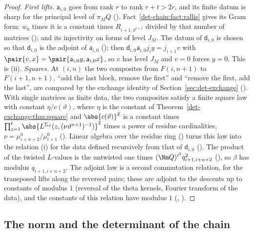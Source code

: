 \begin{proof}
\emph{First lifts.} $\mathsf a_{i,0}$ goes from rank $r$ to rank $r+t>2r$, and its finite datum is sharp
for the principal level of $\pi_MQ$ ().
Fact~\ref{det-chain:fact:rallis} gives its Gram form: $w_0$ times it is a constant times
$R_{i+1,\vartheta^{i+1}}$ divided by that number of matrices
(); and its injectivity on forms of level
$J_M$. The datum of $\mathsf d_{i,0}$ is chosen so that $\mathsf d_{i,0}$ is the adjoint of $\mathsf a_{i,0}$
(); then
$\mathsf d_{i,0}\mathsf a_{i,0}j_iy=j_{i+1}v$ with $\pair{v,x}=\pair{\mathsf a_{i,0}y,\mathsf a_{i,0}x}$, so $v$ has level $J_M$
and $v=0$ forces $y=0$. This is (ii).
\emph{Squares.} At $(i,n)$ the two composites from $F(i,n+1)$ to $F(i+1,n+1)$, ``add the last
block, remove the first'' and ``remove the first, add the last'', are compared by the exchange
identity of Section~\ref{sec:det-exchange} ().
With single matrices as finite data, the two composites satisfy a finite square law with constant
$\eta/c(\vartheta)$, where $\eta$ is the constant of Theorem~\ref{det-exchange:thm:square} and $\abs{c(\vartheta)}^2$ is a constant times
$\prod_{z=1}^{t}\abs{L^{\Sigma_\vartheta}(z,(\nu\vartheta^{n+1})^{-1})}^2$ times a power of residue
cardinalities, $\nu=\mu^0_{i+n+2}/\mu^0_{i+1}$
(). Linear algebra over the residue ring
() turns this law into the relation (i) for the data
defined recursively from that of $\mathsf d_{i,0}$ ().
The product of the twisted $L$-values is the untwisted one times $(\Nm Q)^{t^2}q_{i+1,i+n+2}^2$
(), so $\beta$ has modulus $q_{i+1,i+n+2}$. The
adjoint law is a second commutation relation, for the transposed lifts along the reversed pairs;
these are adjoint to the descents up to constants of modulus $1$ (reversal of the theta kernels,
Fourier transform of the data), and the constants of this relation have modulus $1$
(,
).
\end{proof}

\subsection{The norm and the determinant of the chain}\label{det-chain:sec:chain}

